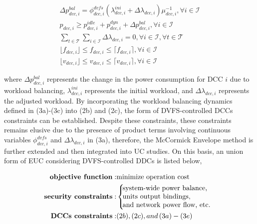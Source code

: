 \documentclass[lettersize,journal]{IEEEtran}
\begin{document}
\vspace{-0.25cm}
\begin{subequations}
  \begin{align}
    \varDelta p_{dcc,i}^{bal} = \phi_{dcc,i}^{dvfs} {\left ( \lambda_{dcc,i}^{ini} + \varDelta \lambda_{dcc,i}\right )}{\mu_{dcc,i}^{-1}}, \forall i\in \mathcal{I}\\
    p_{dcc,i} \geq p_{dcc,i}^{idle} \!+\! p_{dcc,i}^{dyn} + \varDelta p_{dcc,i}^{bal},\forall i\in\mathcal{I}\\
    \sum\nolimits_{t\in\mathcal{T}} \sum\nolimits_{i\in\mathcal{I}} \varDelta \lambda_{dcc,i} = 0, \forall i\in\mathcal{I}, \forall t\in\mathcal{T}\\
    \lfloor f_{dcc,i} \rfloor \leq f_{dcc,i} \leq \lceil f_{dcc,i} \rceil, \forall i\in \mathcal{I}\\
    \lfloor v_{dcc,i} \rfloor \leq v_{dcc,i} \leq \lceil v_{dcc,i} \rceil, \forall i\in \mathcal{I}
  \end{align}
\end{subequations}

\noindent
where $\varDelta p_{dcc,i}^{bal}$ represents the change in the power consumption for DCC $i$ due to workload balancing, $\lambda_{dcc,i}^{ini}$ represents the initial workload, and $\varDelta \lambda_{dcc,i}$ represents the adjusted workload. By incorporating the workload balancing dynamics defined in (3a)-(3c) into (2b) and (2c), the form of DVFS-controlled DCCs constraints can be established.
Despite these constraints, these constraints remains elusive due to the presence of product terms involving continuous variables $\phi_{dcc,i}^{dvfs}$ and $\varDelta \lambda_{dcc,i}$ in (3a), therefore, the McCormick Envelope method is further extended and then integrated into UC studies. On this basis, an union form of EUC considering DVFS-controlled DDCs is listed below,

\vspace{-0.25cm}
\begin{subequations}
  \begin{align}
    \text{\textbf{objective function}}: & \text{minimize operation cost}\\
      \text{\textbf{security constraints}}: & \left \{\!\!\!\! \begin{array}{l}\text{system-wide power balance,}\\ 
        \text{units output bindings,}\\
        \text{and network power flow, etc.}\end{array}\right.\\
        \text{\textbf{DCCs constraints}}:& (2b),(2c), and\, (3a)-(3e)
  \end{align}
\end{subequations}








\end{document}
